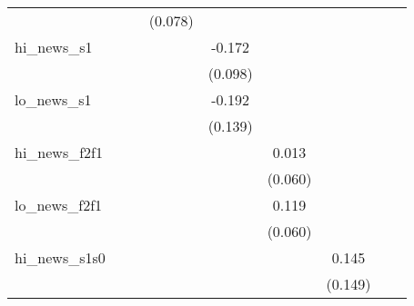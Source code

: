 {\begin{tabular}{l*{8}{c}}
            &                     &                     &     (0.078)         &                     &                     &                     &                     &                     \\
\addlinespace
hi\_news\_s1  &                     &                     &                     &      -0.172\sym{*}  &                     &                     &                     &                     \\
            &                     &                     &                     &     (0.098)         &                     &                     &                     &                     \\
\addlinespace
lo\_news\_s1  &                     &                     &                     &      -0.192         &                     &                     &                     &                     \\
            &                     &                     &                     &     (0.139)         &                     &                     &                     &                     \\
\addlinespace
hi\_news\_f2f1&                     &                     &                     &                     &       0.013         &                     &                     &                     \\
            &                     &                     &                     &                     &     (0.060)         &                     &                     &                     \\
\addlinespace
lo\_news\_f2f1&                     &                     &                     &                     &       0.119\sym{*}  &                     &                     &                     \\
            &                     &                     &                     &                     &     (0.060)         &                     &                     &                     \\
\addlinespace
hi\_news\_s1s0&                     &                     &                     &                     &                     &       0.145         &                     &                     \\
            &                     &                     &                     &                     &                     &     (0.149)         &                     &                     \\

\end{tabular}}
